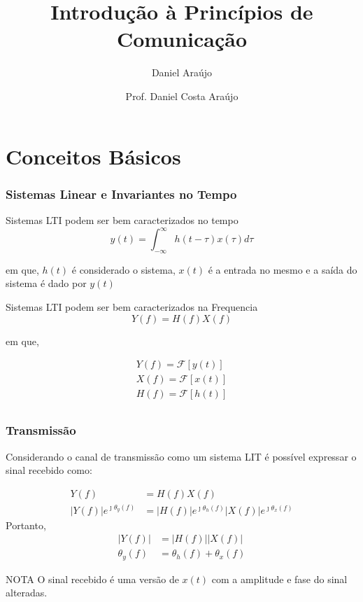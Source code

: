 \documentclass[10pt,hyperref={pdfpagemode=FullScreen},aspectratio=169]{beamer}
\title{\doctitle}
\author{Daniel Araújo}
\institute{\universidade}
\title{Introdução à Princípios de Comunicação}
\author{Prof. Daniel Costa Araújo}
\begin{document}
\frame{\titlepage}


\section{Conceitos Básicos}


\begin{frame}
  \frametitle{Sistemas Linear e Invariantes no Tempo}

  \begin{block}{Sistemas LTI podem ser bem caracterizados no tempo
    }
    $$y(t) = \int _{-\infty}^{\infty} h (t - \tau) x(\tau)d\tau$$

    em que, $h(t)$ é considerado o sistema, $x(t)$ é a entrada no mesmo e a saída do sistema é dado por $y(t)$ 
  \end{block}

\begin{block}{Sistemas LTI podem ser bem caracterizados na Frequencia}
  $$ Y(f) = H(f)X(f) $$

em que, 

\begin{align*}
   Y(f) = \mathcal{F}[y(t)] \\
   X(f) = \mathcal{F}[x(t)] \\
   H(f) = \mathcal{F}[h(t)] \\
\end{align*}

\end{block}

\end{frame}


\begin{frame}
  \frametitle{Transmissão}

Considerando o canal de transmissão como um sistema LIT é possível expressar o sinal recebido como:

  \begin{align*} 
  Y(f)   &= H(f)X(f) \\
  |Y(f)|e^{\jmath \theta _y(f)} &= |H(f)|e^{\jmath \theta _h(f)} |X(f)|e^{\jmath \theta _x(f)}
  \end{align*}
  Portanto,
  \begin{align*} 
  |Y(f)| &= |H(f)| |X(f)| \\
  \theta _y(f) &= \theta _h(f) + \theta _x(f)
  \end{align*}
  
  \begin{block}{NOTA}
    O sinal recebido é uma versão de $x(t)$ com  a amplitude e fase do sinal alteradas.
  \end{block}

\end{frame}
\end{document}
